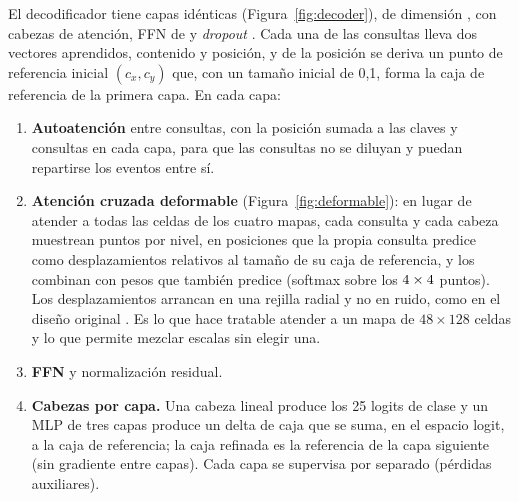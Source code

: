 \documentclass[12pt,a4paper]{article}
\begin{document}
El decodificador tiene \nDecoderLayers{} capas idénticas (Figura~\ref{fig:decoder}), de
dimensión \headDim{}, con \nHeads{} cabezas de atención, FFN de \ffn{} y \textit{dropout}
\dropout{}. Cada una de las \nQueries{} consultas lleva dos vectores aprendidos, contenido y
posición, y de la posición se deriva un punto de referencia inicial $(c_x, c_y)$ que, con un
tamaño inicial de 0,1, forma la caja de referencia de la primera capa. En cada capa:

\begin{enumerate}
    \item \textbf{Autoatención} entre consultas, con la posición sumada a las claves y
          consultas en cada capa, para que las consultas no se diluyan y puedan repartirse los
          eventos entre sí.
    \item \textbf{Atención cruzada deformable} (Figura~\ref{fig:deformable}): en lugar de
          atender a todas las celdas de los cuatro mapas, cada consulta y cada cabeza muestrean
          \nPoints{} puntos por nivel, en posiciones que la propia consulta predice como
          desplazamientos relativos al tamaño de su caja de referencia, y los combinan con
          pesos que también predice (softmax sobre los $4 \times 4$ puntos). Los
          desplazamientos arrancan en una rejilla radial y no en ruido, como en el diseño
          original \citep{zhu_deformable_2021}. Es lo que hace tratable atender a un mapa de
          $48 \times 128$ celdas y lo que permite mezclar escalas sin elegir una.
    \item \textbf{FFN} y normalización residual.
    \item \textbf{Cabezas por capa.} Una cabeza lineal produce los 25 logits de clase y un MLP
          de tres capas produce un delta de caja que se suma, en el espacio logit, a la caja de
          referencia; la caja refinada es la referencia de la capa siguiente (sin gradiente
          entre capas). Cada capa se supervisa por separado (pérdidas auxiliares).
\end{enumerate}
\end{document}
